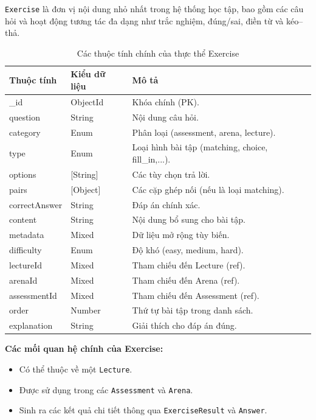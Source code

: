\texttt{Exercise} là đơn vị nội dung nhỏ nhất trong hệ thống học tập, bao gồm các câu hỏi và hoạt động tương tác đa dạng như trắc nghiệm, đúng/sai, điền từ và kéo--thả.
\begin{table}[H]
	\centering
	\begin{tabularx}{\textwidth}{|l|l|X|}
		\hline
		\textbf{Thuộc tính} & \textbf{Kiểu dữ liệu} & \textbf{Mô tả} \\ \hline
		\_id & ObjectId & Khóa chính (PK). \\ \hline
		question & String & Nội dung câu hỏi. \\ \hline
		category & Enum & Phân loại (assessment, arena, lecture). \\ \hline
		type & Enum & Loại hình bài tập (matching, choice, fill\_in,...). \\ \hline
		options & [String] & Các tùy chọn trả lời. \\ \hline
		pairs & [Object] & Các cặp ghép nối (nếu là loại matching). \\ \hline
		correctAnswer & String & Đáp án chính xác. \\ \hline
		content & String & Nội dung bổ sung cho bài tập. \\ \hline
		metadata & Mixed & Dữ liệu mở rộng tùy biến. \\ \hline
		difficulty & Enum & Độ khó (easy, medium, hard). \\ \hline
		lectureId & Mixed & Tham chiếu đến Lecture (ref). \\ \hline
		arenaId & Mixed & Tham chiếu đến Arena (ref). \\ \hline
		assessmentId & Mixed & Tham chiếu đến Assessment (ref). \\ \hline
		order & Number & Thứ tự bài tập trong danh sách. \\ \hline
		explanation & String & Giải thích cho đáp án đúng. \\ \hline
	\end{tabularx}
	\caption{Các thuộc tính chính của thực thể Exercise}
\end{table}
\newline
\textbf{Các mối quan hệ chính của Exercise:}
\begin{itemize}
	\item Có thể thuộc về một \texttt{Lecture}.
	\item Được sử dụng trong các \texttt{Assessment} và \texttt{Arena}.
	\item Sinh ra các kết quả chi tiết thông qua \texttt{ExerciseResult} và \texttt{Answer}.
\end{itemize}

